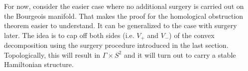 \begin{comment}
In \cite[Section 6]{MNW13}, where the clean cut-out is first introduced,
it is shown that it corresponds to a symplectic cobordism.
The setting there is actually more general: The authors consider a Giroux
domain where already some of the boundary components have been blown down.
In this case, the situation is simpler: The Giroux domain 
$V_- \times S^1 \subset \operatorname{BO}(\Sigma, \dots)$
is directly obtained from the corresponding ideal Liouville domain $V_-$ by 
round contactization.
Its boundary is given by 
\[
    \partial V_- \times S^1 = \Gamma \times S^1.
\]
We want a cobordism from $\operatorname{BO}(\Sigma, \dots)$ to
the same manifold after clean cut-out of $V_- \times S^1$.
Topologically, the cobordism
\[
    W \coloneqq [0,1] \times \operatorname{BO}(\Sigma, \dots) \bigcup_{\{1\} \times \left(V_- \times S^1\right)} V_- \times D^2.
\]
fulfills the requirements: One boundary is simply 
$\operatorname{BO}(\Sigma, \dots)$.
The other boundary is 
\[
    \left[\operatorname{BO}(\Sigma, \dots) \setminus \left(V_- \times S^1\right)\right] 
    \cup_{\Gamma \times S^1} \Gamma \times D^2,
\]
which is homeomorphic to 
$\operatorname{BO}(\Sigma, \dots) \setminus \left(V_- \times S^1\right)$
with blown down boundary, which is exactly the desired clean cut-out.

Next, compute the contact structure on $\operatorname{BO}(\Sigma, \dots) \setminus \left(V_- \times S^1\right)$
with blown down boundary $\partial V_- \times S^1 = \Gamma \times S^1$.

This should be the contact boundary of $V_+ \times D^2$.
Topologically, that makes sense,
\[
    \partial (V_+ \times D^2) = V_+ \times S^1 \cup \partial V_+ \times D^2 = V_+ \times S^1 \cup_{\Gamma \times S^1} \Gamma \times D^2.
\]
However, it is unclear to me why $V_+ \times D^2$ should carry a \underline{symplectic structure}.

It should also be supported by the open book $\operatorname{OB}(V_+, \operatorname{id})$,
which, again, topologically, makes perfect sense, but I don't understand the
\underline{contact side of things}.
\end{comment}

For now, consider the easier case where no additional surgery is carried out on the Bourgeois manifold.
That makes the proof for the homological obstruction theorem easier to understand.
It can be generalized to the case with surgery later.
The idea is to cap off both sides (i.e. $V_+$ and $V_-$) of the convex decomposition
using the surgery procedure introduced in the last section.
Topologically, this will result in $\Gamma \times S^2$ and 
it will turn out to carry a stable Hamiltonian structure.

